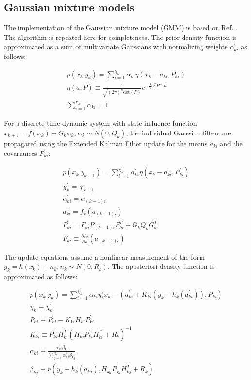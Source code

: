 \documentclass[]{article}
\begin{document}
\subsection{Gaussian mixture models}

The implementation of the Gaussian mixture model (GMM) is based on Ref. \cite{alspach}. The algorithm is repeated here for completeness. The prior density function is approximated as a sum of multivariate Gaussians with normalizing weights $\alpha_{ki}^{'}$ as follows:

\begin{align}
p(x_k | y_k) = \sum_{i=1}^{\chi_k} \alpha_{ki} \eta(x_k-a_{ki},P_{ki}) \\
\eta(a,P) \equiv \frac{1}{\sqrt{(2\pi)^n \mathrm{det}(P)}} e^{-\frac{1}{2} a^T P^{-1} a} \\
\sum_{i=1}^{\chi_k} \alpha_{ki} = 1
\end{align}

For a discrete-time dynamic system with state influence function $x_{k+1} = f(x_k) + G_k w_k,w_k \sim N(0,Q_k)$, the individual Gaussian filters are propagated using the Extended Kalman Filter update for the means $a_{ki}$ and the covariances $P_{ki}^{'}$:

\begin{align}
p(x_{k} | y_{k-1}) = \sum_{i=1}^{\chi_{k}^{'}} \alpha_{ki}^{'} \eta(x_{k}-a_{ki}^{'},P_{ki}^{'}) \\
\chi_{k}^{'} = \chi_{k-1} \\
\alpha_{ki}^{'} = \alpha_{(k-1)i} \\
a_{ki}^{'} = f_k(a_{(k-1)i})\\
P_{ki}^{'} = F_{ki}P_{(k-1)i}F_{ki}^T + G_{k} Q_k G_{k}^T \\
F_{ki} \equiv \frac{\partial f_k}{\partial x} (a_{(k-1)i})
\end{align}

The update equations assume a nonlinear measurement of the form $y_k = h(x_k) + n_k, n_k \sim N(0,R_k)$. The aposteriori density function is approximated as follows:

\begin{align}
p(x_{k} | y_{k}) = \sum_{i=1}^{\chi_{k}} \alpha_{ki} \eta(x_k-(a_{ki}^{'}+K_{ki}(y_k-h_k(a_{ki}^{'})),P_{ki}) \\
\chi_k \equiv \chi_{k}^{'} \\
P_{ki} \equiv P_{ki}^{'} - K_{ki} H_{ki} P_{ki}^{'} \\
K_{ki} \equiv P_{ki}^{'} H_{ki}^T (H_{ki} P_{ki}^{'} H_{ki}^T + R_k)^{-1} \\
\alpha_{ki} \equiv \frac{\alpha_{ki}^{'} \beta_{ki}}{\sum_{j=1}^{\chi_k} \alpha_{kj}^{'} \beta_{kj} } \\
\beta_{kj} \equiv \eta(y_k - h_k(a_{kj}),H_{kj}P_{kj}^{'}H_{kj}^T + R_k)
\end{align}
\end{document}
